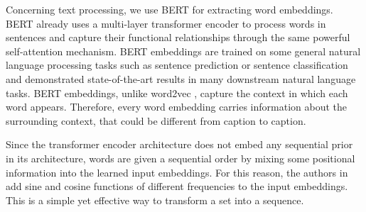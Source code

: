 \documentclass[acmsmall]{acmart}
\begin{document}
Concerning text processing, we use BERT \cite{devlin2019bert} for extracting word embeddings. BERT already uses a multi-layer transformer encoder to process words in sentences and capture their functional relationships through the same powerful self-attention mechanism. BERT embeddings are trained on some general natural language processing tasks such as sentence prediction or sentence classification and demonstrated state-of-the-art results in many downstream natural language tasks.
BERT embeddings, unlike word2vec \cite{Mikolov2013word2vec}, capture the context in which each word appears. Therefore, every word embedding carries information about the surrounding context, that could be different from caption to caption.

Since the transformer encoder architecture does not embed any sequential prior in its architecture, words are given a sequential order by mixing some positional information into the learned input embeddings. For this reason, the authors in \cite{vaswani2017transformer} add sine and cosine functions of different frequencies to the input embeddings. This is a simple yet effective way to transform a set into a sequence.
\end{document}
